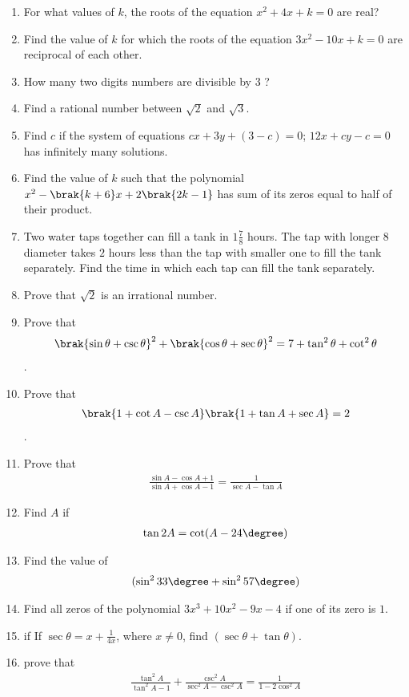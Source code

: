 \begin{enumerate}

  \item For what values of $k$, the roots of the equation $x^2+4x+k = 0$ are real?
  \item Find the value of $k$ for which the roots of the equation $3x^2-10x+k=0$ are reciprocal of each other.
  \item How many two digits numbers are divisible by $3$ ?
  \item Find a rational number between $\sqrt{2}$ and $\sqrt{3}$.
  
  \item Find $c$ if the system of equations $cx+3y+(3-c)=0$; $12x+cy-c=0$ has infinitely many solutions.
  \item Find the value of $k$ such that the polynomial $x^2-\brak{k+6}x+2\brak{2k-1}$ has sum of its zeros equal to half of their product.
  \item Two water taps together can fill a tank in $1\frac{7}{8}$ hours. The tap with longer $8$ diameter takes $2$ hours less than the tap with smaller one to fill the tank separately. Find the time in which each tap can fill the tank separately.
  
  
  
  
  \item Prove that $\sqrt{2}$ is an irrational number.
  \item Prove that \begin{align*} \brak{\sin\theta + \csc\theta}^2 + \brak{\cos\theta + \sec\theta}^2 = 7 + \tan^2\theta + \cot^2\theta\end{align*}.
  \item Prove that \begin{align*}\brak{1+\cot A - \csc A} \brak{1 + \tan A +\sec A} = 2 \end{align*}.
  \item Prove that \begin{align*} \frac{\sin A-\cos A+1}{\sin A+ \cos A-1} =\frac{1}{\sec A-\tan A}\end{align*}
  \item Find $A$ if \begin{align*}\tan 2A = \cot (A-24\degree)\end{align*}
  \item Find the value of \begin{align*}(\sin^2 33\degree+ \sin^2 57\degree)\end{align*}
  
  
  \item Find all zeros of the polynomial $3x ^ 3 + 10x ^ 2 - 9x - 4$ if one of its zero is $1$.
   
  \item if If $\sec\theta = x + \frac{1}{4x}$, where $x \neq 0$, find $(\sec\theta + \tan\theta)$.
  \item prove that \begin{align*} \frac{\tan^2A}{\tan^2 A-1}+\frac{\csc^2 A}{\sec^2 A-\csc^2 A}=\frac{1}{1-2\cos^2 A}\end{align*}
  \end{enumerate}